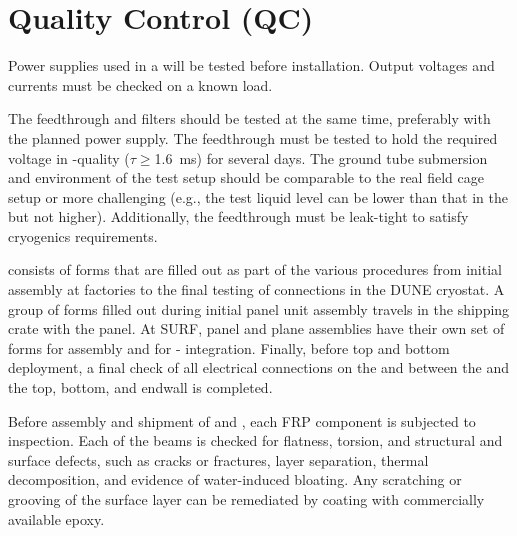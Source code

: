 \section{Quality Control (QC)}
\label{sec:fdsp-hv-qc}

Power supplies used in a  will be tested before installation.  Output voltages and currents must be checked on a known load. 

The feedthrough and filters should be tested at the same time, preferably with the planned power supply.  The feedthrough must be tested to hold the required voltage in -quality  ($\tau\geq$\SI{1.6}{ms}) for several days.  The ground tube submersion and \efield{} environment of the test setup should be comparable to the real field cage setup or more challenging (e.g., the test liquid level can be lower than %
that in the  but not higher).  Additionally, the feedthrough must be leak-tight to satisfy cryogenics requirements.

  consists of forms that are filled out as part of the various procedures from initial assembly at factories to the final testing of connections in the DUNE cryostat.  A group of  forms filled out during initial panel unit assembly travels in the shipping crate with the panel.  At SURF,  panel and  plane assemblies have their own set of  forms for  assembly and for - integration.  Finally, before top and bottom  deployment, a final check of all electrical connections on the  and between the  and the top, bottom, and endwall  is completed.  

Before assembly and shipment of  and , each FRP component is subjected to inspection.
Each of the beams is checked for flatness, torsion, and structural and surface defects, such as cracks or fractures, layer separation, thermal decomposition, and evidence of water-induced bloating. Any scratching or grooving of the surface layer can be remediated by coating with commercially available epoxy.


